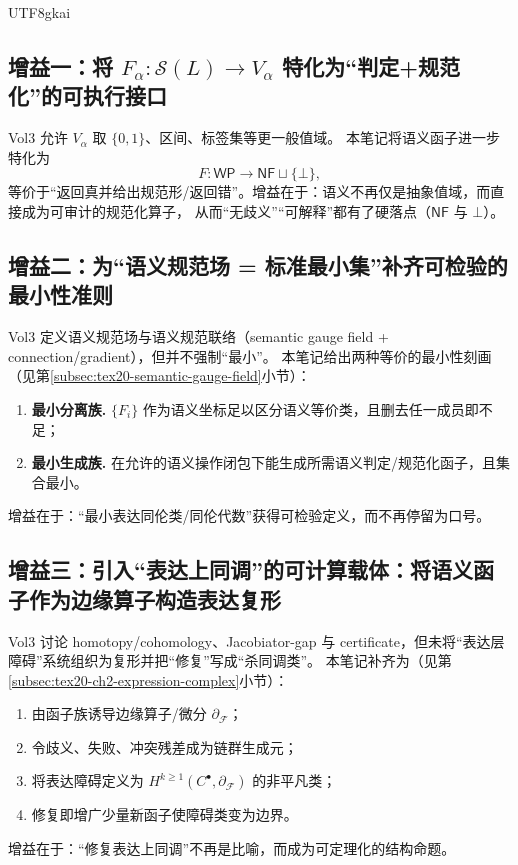 \documentclass[12pt]{article}
\begin{document}
\begin{CJK*}{UTF8}{gkai}
\subsection{增益一：将 $F_\alpha:\mathcal{S}(L)\to V_\alpha$ 特化为“判定+规范化”的可执行接口}
\label{subsec:tex20-ch5-gain1}

Vol3 允许 $V_\alpha$ 取 $\{0,1\}$、区间、标签集等更一般值域。\cite{GaoZhengAppVol3}
本笔记将语义函子进一步特化为
\[
F:\mathsf{WP}\to \mathsf{NF}\sqcup\{\bot\},
\]
等价于“返回真并给出规范形/返回错”。增益在于：语义不再仅是抽象值域，而直接成为可审计的规范化算子，
从而“无歧义”“可解释”都有了硬落点（$\mathsf{NF}$ 与 $\bot$）。

\subsection{增益二：为“语义规范场 = 标准最小集”补齐可检验的最小性准则}
\label{subsec:tex20-ch5-gain2}

Vol3 定义语义规范场与语义规范联络（semantic gauge field + connection/gradient），但并不强制“最小”。\cite{GaoZhengAppVol3}
本笔记给出两种等价的最小性刻画（见第\ref{subsec:tex20-semantic-gauge-field}小节）：
\begin{enumerate}
  \item \textbf{最小分离族.} $\{F_i\}$ 作为语义坐标足以区分语义等价类，且删去任一成员即不足；
  \item \textbf{最小生成族.} 在允许的语义操作闭包下能生成所需语义判定/规范化函子，且集合最小。
\end{enumerate}
增益在于：“最小表达同伦类/同伦代数”获得可检验定义，而不再停留为口号。

\subsection{增益三：引入“表达上同调”的可计算载体：将语义函子作为边缘算子构造表达复形}
\label{subsec:tex20-ch5-gain3}

Vol3 讨论 homotopy/cohomology、Jacobiator-gap 与 certificate，但未将“表达层障碍”系统组织为复形并把“修复”写成“杀同调类”。\cite{GaoZhengAppVol3}
本笔记补齐为（见第\ref{subsec:tex20-ch2-expression-complex}小节）：
\begin{enumerate}
  \item 由函子族诱导边缘算子/微分 $\partial_{\mathcal{F}}$；
  \item 令歧义、失败、冲突残差成为链群生成元；
  \item 将表达障碍定义为 $H^{k\ge 1}(C^\bullet,\partial_{\mathcal{F}})$ 的非平凡类；
  \item 修复即增广少量新函子使障碍类变为边界。\cite{EdgeOperatorTowerTex17,AxiomSemanticsWorkflowTex18}
\end{enumerate}
增益在于：“修复表达上同调”不再是比喻，而成为可定理化的结构命题。


\end{CJK*}
\end{document}
